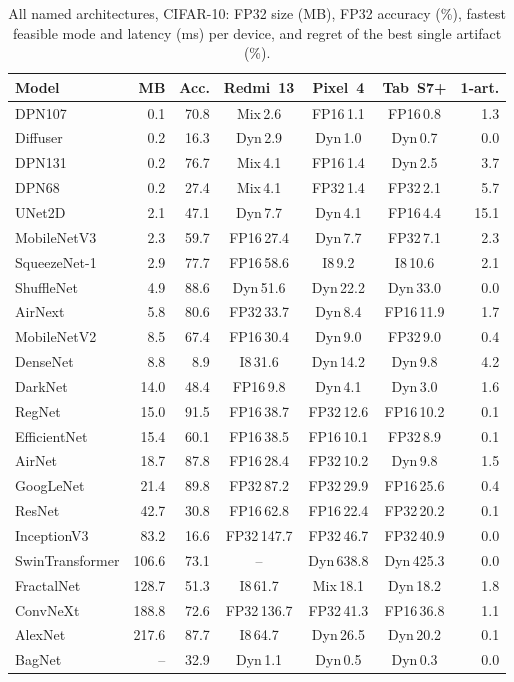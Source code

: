 \begin{table}[!t]
\centering
\caption{All named architectures, CIFAR-10: FP32 size (MB), FP32 accuracy (\%), fastest feasible mode and latency (ms) per device, and regret of the best single artifact (\%).}
\label{tab:named_c10}
\footnotesize
\setlength{\tabcolsep}{2.5pt}
\begin{tabular}{@{}lrrcccr@{}}
\toprule
\textbf{Model} & \textbf{MB} & \textbf{Acc.} & \textbf{Redmi~13} & \textbf{Pixel~4} & \textbf{Tab~S7+} & \textbf{1-art.}\\
\midrule
DPN107 & 0.1 & 70.8 & Mix\,2.6 & FP16\,1.1 & FP16\,0.8 & 1.3 \\
Diffuser & 0.2 & 16.3 & Dyn\,2.9 & Dyn\,1.0 & Dyn\,0.7 & 0.0 \\
DPN131 & 0.2 & 76.7 & Mix\,4.1 & FP16\,1.4 & Dyn\,2.5 & 3.7 \\
DPN68 & 0.2 & 27.4 & Mix\,4.1 & FP32\,1.4 & FP32\,2.1 & 5.7 \\
UNet2D & 2.1 & 47.1 & Dyn\,7.7 & Dyn\,4.1 & FP16\,4.4 & 15.1 \\
MobileNetV3 & 2.3 & 59.7 & FP16\,27.4 & Dyn\,7.7 & FP32\,7.1 & 2.3 \\
SqueezeNet-1 & 2.9 & 77.7 & FP16\,58.6 & I8\,9.2 & I8\,10.6 & 2.1 \\
ShuffleNet & 4.9 & 88.6 & Dyn\,51.6 & Dyn\,22.2 & Dyn\,33.0 & 0.0 \\
AirNext & 5.8 & 80.6 & FP32\,33.7 & Dyn\,8.4 & FP16\,11.9 & 1.7 \\
MobileNetV2 & 8.5 & 67.4 & FP16\,30.4 & Dyn\,9.0 & FP32\,9.0 & 0.4 \\
DenseNet & 8.8 & 8.9 & I8\,31.6 & Dyn\,14.2 & Dyn\,9.8 & 4.2 \\
DarkNet & 14.0 & 48.4 & FP16\,9.8 & Dyn\,4.1 & Dyn\,3.0 & 1.6 \\
RegNet & 15.0 & 91.5 & FP16\,38.7 & FP32\,12.6 & FP16\,10.2 & 0.1 \\
EfficientNet & 15.4 & 60.1 & FP16\,38.5 & FP16\,10.1 & FP32\,8.9 & 0.1 \\
AirNet & 18.7 & 87.8 & FP16\,28.4 & FP32\,10.2 & Dyn\,9.8 & 1.5 \\
GoogLeNet & 21.4 & 89.8 & FP32\,87.2 & FP32\,29.9 & FP16\,25.6 & 0.4 \\
ResNet & 42.7 & 30.8 & FP16\,62.8 & FP16\,22.4 & FP32\,20.2 & 0.1 \\
InceptionV3 & 83.2 & 16.6 & FP32\,147.7 & FP32\,46.7 & FP32\,40.9 & 0.0 \\
SwinTransformer & 106.6 & 73.1 & -- & Dyn\,638.8 & Dyn\,425.3 & 0.0 \\
FractalNet & 128.7 & 51.3 & I8\,61.7 & Mix\,18.1 & Dyn\,18.2 & 1.8 \\
ConvNeXt & 188.8 & 72.6 & FP32\,136.7 & FP32\,41.3 & FP16\,36.8 & 1.1 \\
AlexNet & 217.6 & 87.7 & I8\,64.7 & Dyn\,26.5 & Dyn\,20.2 & 0.1 \\
BagNet & -- & 32.9 & Dyn\,1.1 & Dyn\,0.5 & Dyn\,0.3 & 0.0 \\
\bottomrule
\end{tabular}
\end{table}

